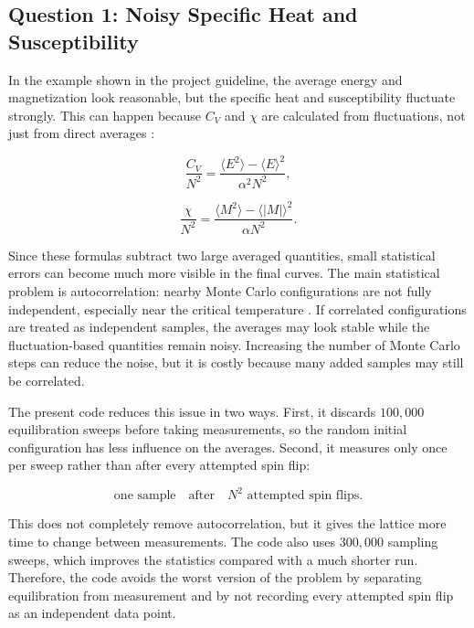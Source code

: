 \documentclass[11pt]{article}
\let\oldsubsection\subsection
\renewcommand{\subsection}[1]{\Needspace{2\baselineskip}\oldsubsection{#1}}
\begin{document}
\subsection{Question 1: Noisy Specific Heat and Susceptibility}

In the example shown in the project guideline, the average energy and magnetization look reasonable, but the specific heat and susceptibility fluctuate strongly. This can happen because $C_V$ and $\chi$ are calculated from fluctuations, not just from direct averages \cite{chandler1987,pathria2011,landau2009}:

\medskip

\begin{equation}
\frac{C_V}{N^2}
=
\frac{\langle E^2\rangle-\langle E\rangle^2}{\alpha^2N^2},
\end{equation}

\medskip
\begin{equation}
\frac{\chi}{N^2}
=
\frac{\langle M^2\rangle-\langle |M|\rangle^2}{\alpha N^2}.
\end{equation}

\medskip
Since these formulas subtract two large averaged quantities, small statistical errors can become much more visible in the final curves. The main statistical problem is autocorrelation: nearby Monte Carlo configurations are not fully independent, especially near the critical temperature \cite{landau2009}. If correlated configurations are treated as independent samples, the averages may look stable while the fluctuation-based quantities remain noisy. Increasing the number of Monte Carlo steps can reduce the noise, but it is costly because many added samples may still be correlated.

The present code reduces this issue in two ways. First, it discards $100{,}000$ equilibration sweeps before taking measurements, so the random initial configuration has less influence on the averages. Second, it measures only once per sweep rather than after every attempted spin flip:

\medskip

\begin{equation}
\text{one sample} \quad \text{after} \quad N^2 \text{ attempted spin flips}.
\end{equation}

\medskip
This does not completely remove autocorrelation, but it gives the lattice more time to change between measurements. The code also uses $300{,}000$ sampling sweeps, which improves the statistics compared with a much shorter run. Therefore, the code avoids the worst version of the problem by separating equilibration from measurement and by not recording every attempted spin flip as an independent data point.
\end{document}
